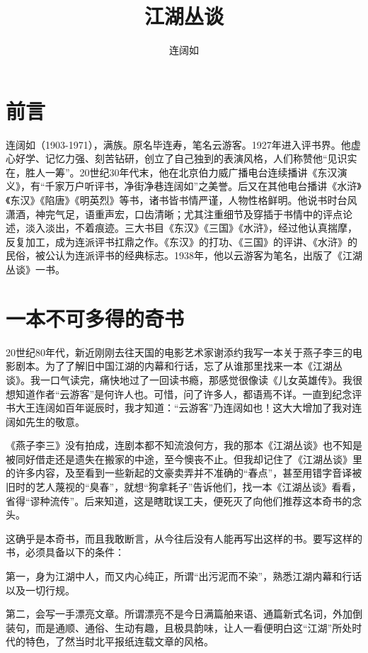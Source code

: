 \documentclass[12pt,UTF8]{ctexbook}
\title{\heiti\zihao{0} 江湖丛谈}
\author{连阔如}
\date{}
\begin{document}
\maketitle
\tableofcontents

\frontmatter

\chapter{前言}

连阔如（1903-1971），满族。原名毕连寿，笔名云游客。1927年进入评书界。他虚心好学、记忆力强、刻苦钻研，创立了自己独到的表演风格，人们称赞他“见识实在，胜人一筹”。20世纪30年代末，他在北京伯力威广播电台连续播讲《东汉演义》，有“千家万户听评书，净街净巷连阔如”之美誉。后又在其他电台播讲《水浒》《东汉》《陷唐》《明英烈》等书，诸书皆书情严谨，人物性格鲜明。他说书时台风潇酒，神完气足，语重声宏，口齿清晰；尤其注重细节及穿插于书情中的评点论述，淡入淡出，不着痕迹。三大书目《东汉》《三国》《水浒》，经过他认真揣摩，反复加工，成为连派评书扛鼎之作。《东汉》的打功、《三国》的评讲、《水浒》的民俗，被公认为连派评书的经典标志。1938年，他以云游客为笔名，出版了《江湖丛谈》一书。

\chapter{一本不可多得的奇书}

20世纪80年代，新近刚刚去往天国的电影艺术家谢添约我写一本关于燕子李三的电影剧本。为了了解旧中国江湖的内幕和行话，忘了从谁那里找来一本《江湖丛谈》。我一口气读完，痛快地过了一回读书瘾，那感觉很像读《儿女英雄传》。我很想知道作者“云游客”是何许人也。可惜，问了许多人，都语焉不详。一直到纪念评书大王连阔如百年诞辰时，我才知道：“云游客”乃连阔如也！这大大增加了我对连阔如先生的敬意。

《燕子李三》没有拍成，连剧本都不知流浪何方，我的那本《江湖丛谈》也不知是被同好借走还是遗失在搬家的中途，至今懊丧不止。但我却记住了《江湖丛谈》里的许多内容，及至看到一些新起的文豪卖弄并不准确的“春点”，甚至用错字音译被旧时的艺人蔑视的“臭春”，就想“狗拿耗子”告诉他们，找一本《江湖丛谈》看看，省得“谬种流传”。后来知道，这是瞎耽误工夫，便死灭了向他们推荐这本奇书的念头。

这确乎是本奇书，而且我敢断言，从今往后没有人能再写出这样的书。要写这样的书，必须具备以下的条件：

第一，身为江湖中人，而又内心纯正，所谓“出污泥而不染”，熟悉江湖内幕和行话以及一切行规。

第二，会写一手漂亮文章。所谓漂亮不是今日满篇舶来语、通篇新式名词，外加倒装句，而是通顺、通俗、生动有趣，且极具韵味，让人一看便明白这“江湖”所处时代的特色，了然当时北平报纸连载文章的风格。
\end{document}
